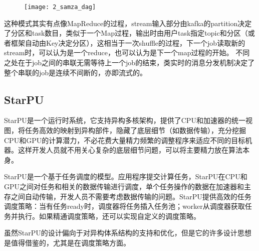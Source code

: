 \begin{figure}[!htbp]
    \centering
    \texttt{[image: 2\_samza\_dag]}
    \label{fig:2_samza_dag}
\end{figure}

这种模式其实有点像MapReduce的过程，stream输入部分由kafka的partition决定了分区和task数目，类似于一个Map过程，输出时由用户task指定topic和分区（或者框架自动由Key决定分区），这相当于一次shuffle的过程，下一个job读取新的stream时，可以认为是一个reduce，也可以认为是下一个map过程的开始。
不同之处在于job之间的串联无需等待上一个job的结束，类实时的消息分发机制决定了整个串联的job是连续不间断的，亦即流式的。

\subsection{StarPU}

StarPU\citep{augonnet2011starpu}是一个运行时系统，它支持异构多核架构，提供了CPU和加速器的统一视图，将任务高效的映射到异构部件，隐藏了底层细节（如数据传输），充分挖掘CPU和GPU的计算潜力，不必花费大量精力频繁的调整程序来适应不同的目标机器。这样开发人员就不用关心复杂的底层细节问题，可以将主要精力放在算法本身。

StarPU是一个基于任务调度的模型。应用程序提交计算任务，StarPU在CPU和GPU之间对任务和相关的数据传输进行调度，单个任务操作的数据在加速器和主存之间自动传输，开发人员不需要考虑数据传输的问题。StarPU提供高效的任务调度策略：当有任务ready时，调度器将任务插入任务池；worker从调度器获取任务并执行。如果精通调度策略，还可以实现自定义的调度策略。

虽然StarPU的设计偏向于对异构体系结构的支持和优化，但是它的许多设计思想是值得借鉴的，尤其是在调度策略方面。



